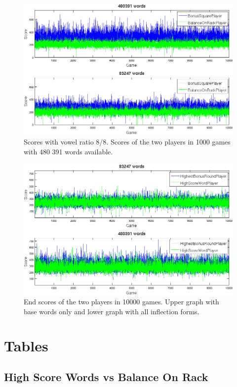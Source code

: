 \documentclass[a4paper, 12pt]{report}
\begin{document}
\begin{figure}[h]
\centering
\includegraphics[scale=0.52]{BonusBalance8vow_bothDict_cropped}
\caption {Scores with vowel ratio 8/8. Scores of the two players in 1000 games with 480 391 words available.}
\label{fig:bonusBalanceLargeDict}
\end{figure}

\begin{figure}[h]
\centering
\includegraphics[scale=0.52]{Highest_Bonus_Round_vs_High_Score_Word_10000_cropped}
\caption {End scores of the two players in 10000 games. Upper graph with base words only and lower graph with all inflection forms.}
\label{fig:bs+hsw+totalscores}
\end{figure}


\chapter{Tables}

\section{High Score Words vs Balance On Rack}
\end{document}
